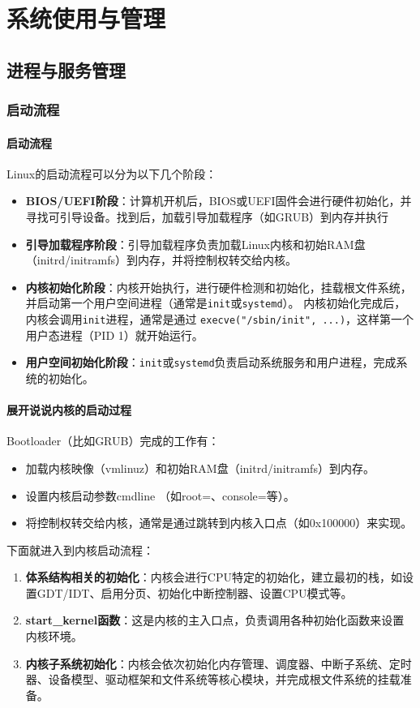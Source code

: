 \section{系统使用与管理}

\subsection{进程与服务管理}

\subsubsection{启动流程}

\paragraph{启动流程}
Linux的启动流程可以分为以下几个阶段：
\begin{itemize}
    \item \textbf{BIOS/UEFI阶段}：计算机开机后，BIOS或UEFI固件会进行硬件初始化，并寻找可引导设备。找到后，加载引导加载程序（如GRUB）到内存并执行
    \item \textbf{引导加载程序阶段}：引导加载程序负责加载Linux内核和初始RAM盘（initrd/initramfs）到内存，并将控制权转交给内核。
    \item \textbf{内核初始化阶段}：内核开始执行，进行硬件检测和初始化，挂载根文件系统，并启动第一个用户空间进程（通常是\texttt{init}或\texttt{systemd}）。
    内核初始化完成后，内核会调用\texttt{init}进程，通常是通过
    \texttt{execve("/sbin/init", ...)}，这样第一个用户态进程（PID 1）就开始运行。
    
    \item \textbf{用户空间初始化阶段}：\texttt{init}或\texttt{systemd}负责启动系统服务和用户进程，完成系统的初始化。
\end{itemize}

\paragraph{展开说说内核的启动过程}
Bootloader（比如GRUB）完成的工作有：
\begin{itemize}
    \item 加载内核映像（vmlinuz）和初始RAM盘（initrd/initramfs）到内存。
    \item 设置内核启动参数cmdline （如root=、console=等）。
    \item 将控制权转交给内核，通常是通过跳转到内核入口点（如0x100000）来实现。
\end{itemize}
下面就进入到内核启动流程：
\begin{enumerate}
    \item \textbf{体系结构相关的初始化}：内核会进行CPU特定的初始化，建立最初的栈，如设置GDT/IDT、启用分页、初始化中断控制器、设置CPU模式等。
    \item \textbf{start\_kernel函数}：这是内核的主入口点，负责调用各种初始化函数来设置内核环境。
    \item \textbf{内核子系统初始化}：内核会依次初始化内存管理、调度器、中断子系统、定时器、设备模型、驱动框架和文件系统等核心模块，并完成根文件系统的挂载准备。
\end{enumerate}





